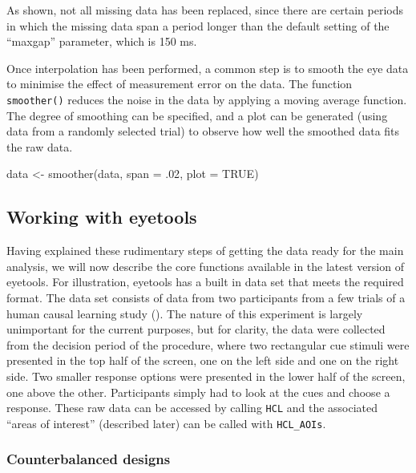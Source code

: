 \documentclass[
  man,
  floatsintext,
  longtable,
  nolmodern,
  notxfonts,
  notimes,
  colorlinks=true,linkcolor=blue,citecolor=blue,urlcolor=blue]{apa7}
\newenvironment{Shaded}{\begin{snugshade}}{\end{snugshade}}
\newcommand{\AttributeTok}[1]{\textcolor[rgb]{0.40,0.45,0.13}{#1}}
\newcommand{\ConstantTok}[1]{\textcolor[rgb]{0.56,0.35,0.01}{#1}}
\newcommand{\DecValTok}[1]{\textcolor[rgb]{0.68,0.00,0.00}{#1}}
\newcommand{\FunctionTok}[1]{\textcolor[rgb]{0.28,0.35,0.67}{#1}}
\newcommand{\NormalTok}[1]{\textcolor[rgb]{0.00,0.23,0.31}{#1}}
\newcommand{\OtherTok}[1]{\textcolor[rgb]{0.00,0.23,0.31}{#1}}
\begin{document}
As shown, not all missing data has been replaced, since there are
certain periods in which the missing data span a period longer than the
default setting of the ``maxgap'' parameter, which is 150 ms.

Once interpolation has been performed, a common step is to smooth the
eye data to minimise the effect of measurement error on the data. The
function \texttt{smoother()} reduces the noise in the data by applying a
moving average function. The degree of smoothing can be specified, and a
plot can be generated (using data from a randomly selected trial) to
observe how well the smoothed data fits the raw data.

\begin{Shaded}
\begin{Highlighting}[]
\NormalTok{data }\OtherTok{\textless{}{-}} \FunctionTok{smoother}\NormalTok{(data,}
                 \AttributeTok{span =}\NormalTok{ .}\DecValTok{02}\NormalTok{,}
                 \AttributeTok{plot =} \ConstantTok{TRUE}\NormalTok{)}
\end{Highlighting}
\end{Shaded}

\subsection{Working with eyetools}\label{working-with-eyetools}

Having explained these rudimentary steps of getting the data ready for
the main analysis, we will now describe the core functions available in
the latest version of eyetools. For illustration, eyetools has a built
in data set that meets the required format. The data set consists of
data from two participants from a few trials of a human causal learning
study (). The nature of
this experiment is largely unimportant for the current purposes, but for
clarity, the data were collected from the decision period of the
procedure, where two rectangular cue stimuli were presented in the top
half of the screen, one on the left side and one on the right side. Two
smaller response options were presented in the lower half of the screen,
one above the other. Participants simply had to look at the cues and
choose a response. These raw data can be accessed by calling
\texttt{HCL} and the associated ``areas of interest'' (described later)
can be called with \texttt{HCL\_AOIs}.

\subsubsection{Counterbalanced designs}\label{counterbalanced-designs}
\end{document}
